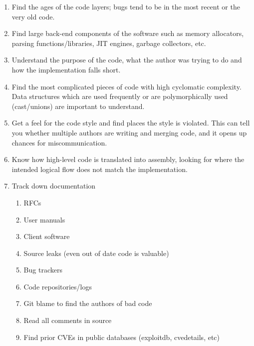\documentclass[12pt]{Training}
\begin{document}
\begin{enumerate}
\begin{enumerate}
		\item Find the ages of the code layers; bugs tend to be in the most recent or the very old code.
		\item Find large back-end components of the software such as memory allocators, parsing functions/libraries, JIT engines, garbage collectors, etc.
		\item Understand the purpose of the code, what the author was trying to do and how the implementation falls short.
		\item Find the most complicated pieces of code with high cyclomatic complexity. Data structures which are used frequently or are polymorphically used (cast/unions) are important to understand.
		\item Get a feel for the code style and find places the style is violated. This can tell you whether multiple authors are writing and merging code, and it opens up chances for miscommunication.
		\item Know how high-level code is translated into assembly, looking for where the intended logical flow does not match the implementation.
		\item Track down documentation
			\begin{enumerate}
				\item RFCs
				\item User manuals
				\item Client software
				\item Source leaks (even out of date code is valuable)
				\item Bug trackers
				\item Code repositories/logs
				\item Git blame to find the authors of bad code
				\item Read all comments in source
				\item Find prior CVEs in public databases (exploitdb, cvedetails, etc)
			\end{enumerate}
	\end{enumerate}
\end{enumerate}
\end{document}
